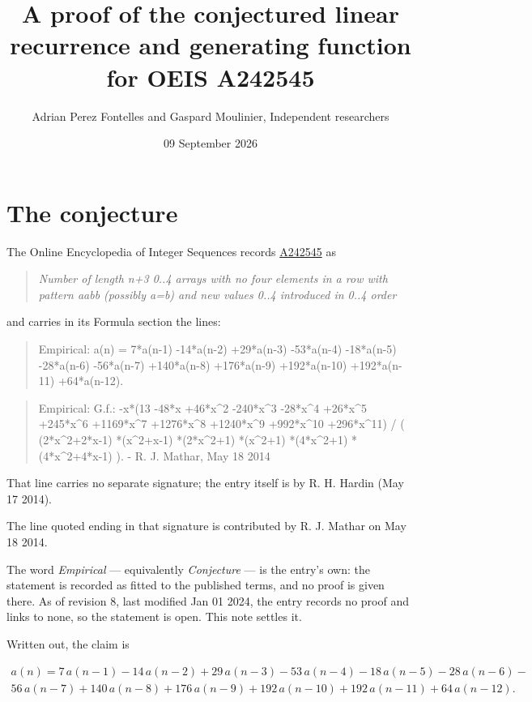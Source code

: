 \documentclass[11pt]{article}
\title{A proof of the conjectured linear recurrence and generating function for OEIS A242545}
\author{Adrian Perez Fontelles and Gaspard Moulinier, Independent researchers}
\date{09 September 2026}
\theoremstyle{definition}
\begin{document}
\maketitle
\section{The conjecture}

The Online Encyclopedia of Integer Sequences records \href{https://oeis.org/A242545}{A242545} as

\begin{quote}\itshape Number of length n+3 0..4 arrays with no four elements in a row with pattern aabb (possibly a=b) and new values 0..4 introduced in 0..4 order\end{quote}

and carries in its Formula section the lines:

\begin{quote}\ttfamily Empirical: a(n) = 7*a(n-1) -14*a(n-2) +29*a(n-3) -53*a(n-4) -18*a(n-5) -28*a(n-6) -56*a(n-7) +140*a(n-8) +176*a(n-9) +192*a(n-10) +192*a(n-11) +64*a(n-12).\end{quote}

\begin{quote}\ttfamily Empirical: G.f.:  -x*(13 -48*x +46*x\textasciicircum{}2 -240*x\textasciicircum{}3 -28*x\textasciicircum{}4 +26*x\textasciicircum{}5 +245*x\textasciicircum{}6 +1169*x\textasciicircum{}7 +1276*x\textasciicircum{}8 +1240*x\textasciicircum{}9 +992*x\textasciicircum{}10 +296*x\textasciicircum{}11) / ( (2*x\textasciicircum{}2+2*x-1) *(x\textasciicircum{}2+x-1) *(2*x\textasciicircum{}2+1) *(x\textasciicircum{}2+1) *(4*x\textasciicircum{}2+1) *(4*x\textasciicircum{}2+4*x-1) ). - R. J. Mathar, May 18 2014\end{quote}

That line carries no separate signature; the entry itself is by R. H. Hardin (May 17 2014).

The line quoted ending in that signature is contributed by R. J. Mathar on May 18 2014.

The word {\itshape Empirical} --- equivalently {\itshape Conjecture} --- is the entry's own: the statement is recorded as fitted to the published terms, and no proof is given there. As of revision 8, last modified Jan 01 2024, the entry records no proof and links to none, so the statement is open. This note settles it.

Written out, the claim is

\begin{multline*} a(n) = 7\,a(n-1) - 14\,a(n-2) + 29\,a(n-3) - 53\,a(n-4) - 18\,a(n-5) - 28\,a(n-6) - \\ 56\,a(n-7) + 140\,a(n-8) + 176\,a(n-9) + 192\,a(n-10) + 192\,a(n-11) + 64\,a(n-12). \end{multline*}
\end{document}
